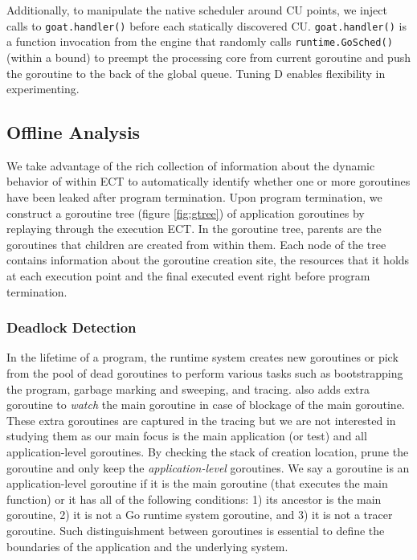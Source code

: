 Additionally, to manipulate the native scheduler around CU points, we inject calls to \texttt{goat.handler()} before each statically discovered CU. \texttt{goat.handler()} is a function invocation from the \goat engine that randomly calls \texttt{runtime.GoSched()} (within a bound) to preempt the processing core from current goroutine and push the goroutine to the back of the global queue.
%
Tuning D enables flexibility in experimenting.

\subsection{Offline Analysis}
We take advantage of the rich collection of information about the dynamic behavior of within ECT to automatically identify whether one or more goroutines have been leaked after program termination.
%
Upon program termination, we construct a goroutine tree (figure \ref{fig:gtree}) of application goroutines by replaying through the execution ECT.
%
In the goroutine tree, parents are the goroutines that children are created from within them. Each node of the tree contains information about the goroutine creation site, the resources that it holds at each execution point and the final executed event right before program termination.

\subsubsection{Deadlock Detection}
\label{sec:dld}
In the lifetime of a program, the runtime system creates new goroutines or pick from the pool of dead goroutines to perform various tasks such as bootstrapping the program, garbage marking and sweeping, and tracing.
%
\goat also adds extra goroutine to \textit{watch} the main goroutine in case of blockage of the main goroutine.
%
These extra goroutines are captured in the tracing but we are not interested in studying them as our main focus is the main application (or test) and all application-level goroutines.
%
By checking the stack of creation location, \goat prune the goroutine and only keep the \textit{application-level} goroutines.
%
We say a goroutine is an application-level goroutine if it is the main goroutine (that executes the main function) or it has all of the following conditions:
1) its ancestor is the main goroutine,
2) it is not a Go runtime system goroutine, and
3) it is not a tracer goroutine.
Such distinguishment between goroutines is essential to define the boundaries of the application and the underlying system.

